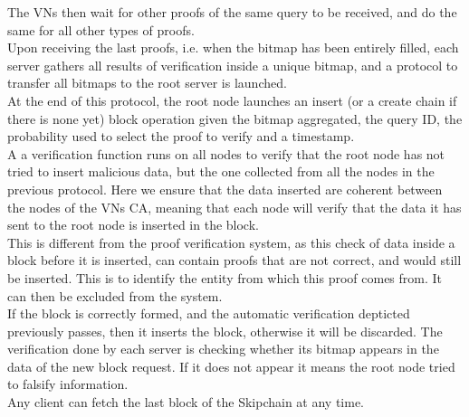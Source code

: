 \documentclass{article}
\begin{document}
The VNs then wait for other proofs of the same query to be received, and do the same for all other types of proofs.\\
Upon receiving the last proofs, i.e. when the bitmap has been entirely filled, each server gathers all results of verification inside a unique bitmap, and a protocol to transfer all bitmaps to the root server is launched.\\
At the end of this protocol, the root node launches an insert (or a create chain if there is none yet) block operation given the bitmap aggregated, the query ID, the probability used to select the proof to verify and a timestamp.\\
A a verification function runs on all nodes to verify that the root node has not tried to insert malicious data, but the one collected from all the nodes in the previous protocol.
Here we ensure that the data inserted are coherent between the nodes of the VNs CA, meaning that each node will verify that the data it has sent to the root node is inserted in the block.\\
This is different from the proof verification system, as this check of data inside a block before it is inserted, can contain proofs that are not correct, and would still be inserted. This is to identify the entity from which this proof comes from. It can then be excluded from the system.\\
If the block is correctly formed, and the automatic verification depticted previously passes, then it inserts the block, otherwise it will be discarded. The verification done by each server is checking whether its bitmap appears in the data of the new block request. If it does not appear it means the root node tried to falsify information.\\
Any client can fetch the last block of the Skipchain at any time.\\
\end{document}

